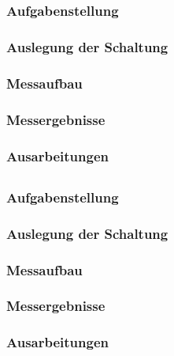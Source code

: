 \chapter{}
	\section{}
		\subsection{Aufgabenstellung}

		\subsection{Auslegung der Schaltung}

		\subsection{Messaufbau}

		\subsection{Messergebnisse}

		\subsection{Ausarbeitungen}
	\section{}
		\subsection{Aufgabenstellung}

		\subsection{Auslegung der Schaltung}

		\subsection{Messaufbau}

		\subsection{Messergebnisse}

		\subsection{Ausarbeitungen}

